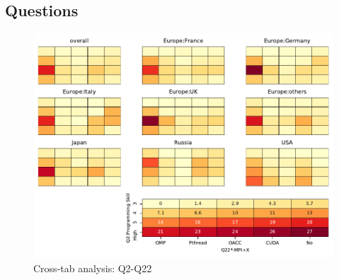 
\subsection{Questions}


\begin{figure}
\begin{center}
\includegraphics[width=12cm]{../pdfs/Q2-Q22.pdf}
\caption{Cross-tab analysis: Q2-Q22}
\label{fig:Q2-Q22}
\end{center}
\end{figure}
